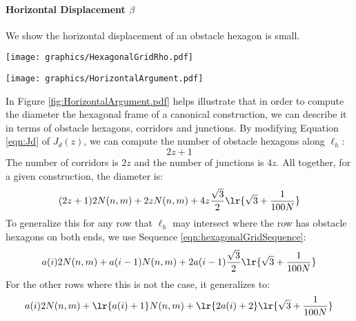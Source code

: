 \paragraph{Horizontal Displacement $\beta$}

We show the horizontal displacement of an obstacle hexagon is small.

\begin{minipage}{\linewidth}
\begin{center}
\texttt{[image: graphics/HexagonalGridRho.pdf]}
\label{fig:Hexagonal.pdf}
\end{center}
\end{minipage}


\begin{minipage}{\linewidth}
\begin{center}
\texttt{[image: graphics/HorizontalArgument.pdf]}
\label{fig:HorizontalArgument.pdf}
\end{center}
\end{minipage}

In Figure \ref{fig:HorizontalArgument.pdf} helps illustrate that in order to compute the diameter the hexagonal frame of a canonical construction, we can describe it in terms of obstacle hexagons, corridors and junctions.
By modifying Equation \ref{eqn:Jd} of $J_d(z)$, we can compute the number of obstacle hexagons along $\ell_h$:
$$2z+1$$
The number of corridors is $2z$ and the number of junctions is $4z$.
All together, for a given construction, the diameter is:
\begin{equation}\label{eqn:diameterLh}
(2z+1)2N(n,m) + 2z N(n,m) + 4z \frac{\sqrt{3}}{2} \lr{\sqrt{3}+\frac{1}{100N}}
\end{equation}
To generalize this for any row that $\ell_h$ may intersect where the row has obstacle hexagons on both ends, we use Sequence \ref{eqn:hexagonalGridSequence}:
$$a(i)2N(n,m) + a(i-1) N(n,m) + 2a(i-1) \frac{\sqrt{3}}{2} \lr{\sqrt{3}+\frac{1}{100N}}$$
For the other rows where this is not the case, it generalizes to:
$$a(i) 2N(n,m) + \lr{a(i) + 1} N(n,m) + \lr{2 a(i) + 2} \lr{\sqrt{3}+\frac{1}{100N}}$$

